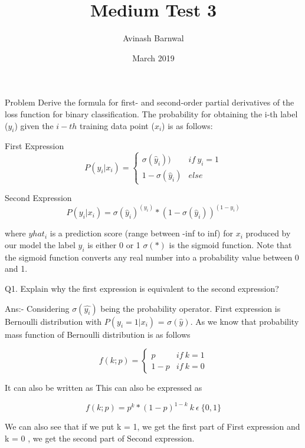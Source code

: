 \documentclass{article}
\title{Medium Test 3}
\author{Avinash Barnwal}
\date{March 2019}
\begin{document}
\maketitle
\begin{flushleft}

{Problem} Derive the formula for first- and second-order partial derivatives of the loss function for binary classification. The probability for obtaining the i-th label ($y_i$) given the $i-th$ training data point ($x_i$) is as follows:

First Expression
\begin{equation}
 P(y_i | x_i) = 
    \begin{cases}
      \sigma(\hat{y}_i)) & if \ y_i =1 \\
      1-\sigma(\hat{y}_i) & else
    \end{cases}
  \end{equation}

Second Expression  
\begin{equation}
 P(y_i | x_i) = \sigma(\hat{y}_i)^{(y_i)}*(1 - \sigma(\hat{y}_i))^{(1-y_i)}
\end{equation}  

where $yhat_i$ is a prediction score (range between -inf to inf) for $x_i$ produced by our model the label $y_i$ is either 0 or 1 $\sigma(*)$ is the sigmoid function.
Note that the sigmoid function converts any real number into a probability value between 0 and 1.

Q1. Explain why the first expression is equivalent to the second expression? 

Ans:- Considering $\sigma(\hat{y_i})$ being the probability operator. First expression is Bernoulli distribution with $P(y_i=1|x_i)$ = $\sigma(\hat{y})$. As we know that probability mass function of Bernoulli distribution is as follows

\begin{equation}
 f(k;p)=
    \begin{cases}
      p & if \ k = 1 \\
      1-p & if \ k = 0
    \end{cases}
\end{equation}

It can also be written as This can also be expressed as

\begin{equation}
    f(k;p) = p^{k}*(1-p)^{1-k} \ k \ \epsilon \ \{0,1\} 
\end{equation}

We can also see that if we put k = 1, we get the first part of First expression and k = 0 , we get the second part of Second expression.




\end{flushleft}
\end{document}
